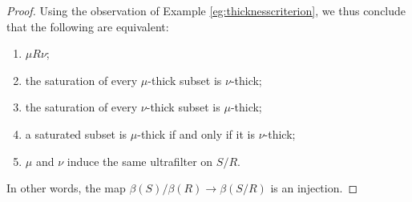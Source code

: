 \begin{proof}
	Using the observation of Example \ref{eg:thicknesscriterion},
	we thus conclude that the following are equivalent:
	\begin{enumerate}
		\item $ \mu R \nu $;
		\item the saturation of every $ \mu $-thick subset
			is $ \nu $-thick;
		\item the saturation of every $ \nu $-thick subset
			is $ \mu $-thick;
		\item a saturated subset is $ \mu $-thick if and only if
			it is $ \nu $-thick;
		\item $ \mu $ and $ \nu $ induce the same ultrafilter
			on $ S/R $.
	\end{enumerate}
	In other words, the map $ \beta(S)/\beta(R) \to \beta(S/R) $
	is an injection.
\end{proof}

